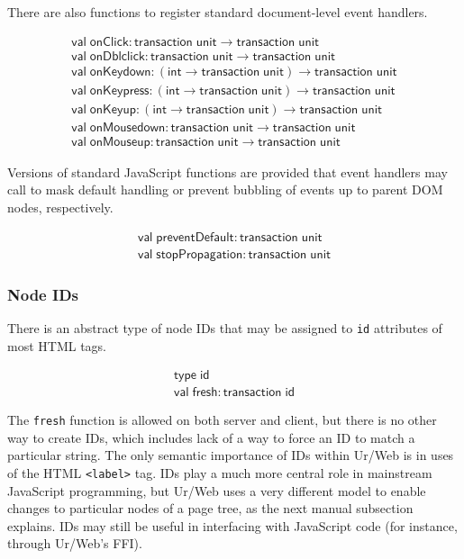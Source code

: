 \documentclass{article}
\newcommand{\cd}[1]{\texttt{#1}}
\newcommand{\mt}[1]{\mathsf{#1}}
\begin{document}
There are also functions to register standard document-level event handlers.

$$\begin{array}{l}
 \mt{val} \; \mt{onClick} : \mt{transaction} \; \mt{unit} \to \mt{transaction} \; \mt{unit} \\
 \mt{val} \; \mt{onDblclick} : \mt{transaction} \; \mt{unit} \to \mt{transaction} \; \mt{unit} \\
 \mt{val} \; \mt{onKeydown} : (\mt{int} \to \mt{transaction} \; \mt{unit}) \to \mt{transaction} \; \mt{unit} \\
 \mt{val} \; \mt{onKeypress} : (\mt{int} \to \mt{transaction} \; \mt{unit}) \to \mt{transaction} \; \mt{unit} \\
 \mt{val} \; \mt{onKeyup} : (\mt{int} \to \mt{transaction} \; \mt{unit}) \to \mt{transaction} \; \mt{unit} \\
 \mt{val} \; \mt{onMousedown} : \mt{transaction} \; \mt{unit} \to \mt{transaction} \; \mt{unit} \\
 \mt{val} \; \mt{onMouseup} : \mt{transaction} \; \mt{unit} \to \mt{transaction} \; \mt{unit}
\end{array}$$

Versions of standard JavaScript functions are provided that event handlers may call to mask default handling or prevent bubbling of events up to parent DOM nodes, respectively.

$$\begin{array}{l}
  \mt{val} \; \mt{preventDefault} : \mt{transaction} \; \mt{unit} \\
  \mt{val} \; \mt{stopPropagation} : \mt{transaction} \; \mt{unit}
\end{array}$$

\subsubsection{Node IDs}

There is an abstract type of node IDs that may be assigned to \cd{id} attributes of most HTML tags.

$$\begin{array}{l}
  \mt{type} \; \mt{id} \\
  \mt{val} \; \mt{fresh} : \mt{transaction} \; \mt{id}
\end{array}$$

The \cd{fresh} function is allowed on both server and client, but there is no other way to create IDs, which includes lack of a way to force an ID to match a particular string.  The only semantic importance of IDs within Ur/Web is in uses of the HTML \cd{<label>} tag.  IDs play a much more central role in mainstream JavaScript programming, but Ur/Web uses a very different model to enable changes to particular nodes of a page tree, as the next manual subsection explains.  IDs may still be useful in interfacing with JavaScript code (for instance, through Ur/Web's FFI).
\end{document}
